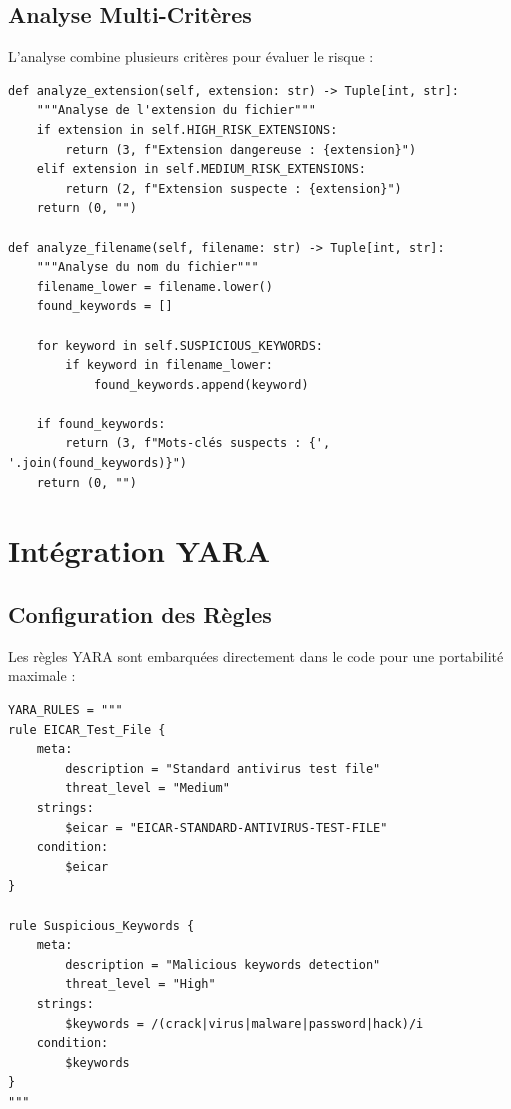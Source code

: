 \documentclass[12pt,a4paper]{report}
\begin{document}
\subsection{Analyse Multi-Critères}

L'analyse combine plusieurs critères pour évaluer le risque :

\begin{lstlisting}[caption={Fonctions d'analyse}]
def analyze_extension(self, extension: str) -> Tuple[int, str]:
    """Analyse de l'extension du fichier"""
    if extension in self.HIGH_RISK_EXTENSIONS:
        return (3, f"Extension dangereuse : {extension}")
    elif extension in self.MEDIUM_RISK_EXTENSIONS:
        return (2, f"Extension suspecte : {extension}")
    return (0, "")

def analyze_filename(self, filename: str) -> Tuple[int, str]:
    """Analyse du nom du fichier"""
    filename_lower = filename.lower()
    found_keywords = []
    
    for keyword in self.SUSPICIOUS_KEYWORDS:
        if keyword in filename_lower:
            found_keywords.append(keyword)
    
    if found_keywords:
        return (3, f"Mots-clés suspects : {', '.join(found_keywords)}")
    return (0, "")
\end{lstlisting}

\section{Intégration YARA}

\subsection{Configuration des Règles}

Les règles YARA sont embarquées directement dans le code pour une portabilité maximale :

\begin{lstlisting}[caption={Règles YARA intégrées}]
YARA_RULES = """
rule EICAR_Test_File {
    meta:
        description = "Standard antivirus test file"
        threat_level = "Medium"
    strings:
        $eicar = "EICAR-STANDARD-ANTIVIRUS-TEST-FILE"
    condition:
        $eicar
}

rule Suspicious_Keywords {
    meta:
        description = "Malicious keywords detection"
        threat_level = "High"
    strings:
        $keywords = /(crack|virus|malware|password|hack)/i
    condition:
        $keywords
}
"""
\end{lstlisting}
\end{document}
